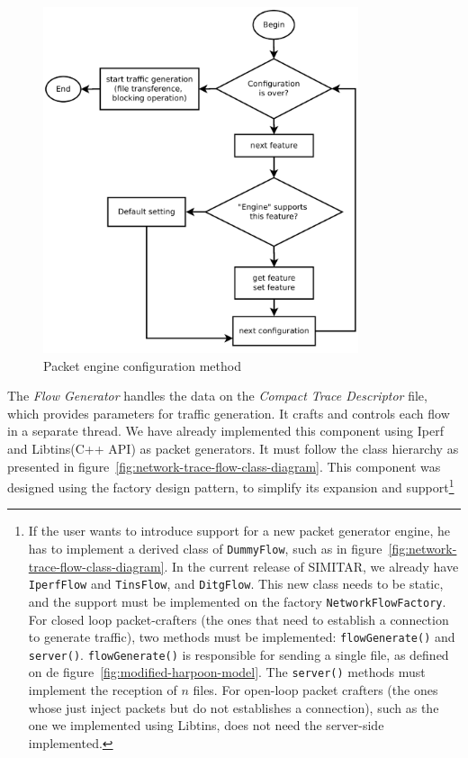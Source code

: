 \begin{figure}[pht!]
    \centering
    \includegraphics[height=4.0in]{figures/ch3/alg-traffic-engine-config}
    \caption{Packet engine configuration method}
    \label{fig:alg-traffic-engine-config}
\end{figure}



The \textit{Flow Generator} handles the data on the \textit{Compact Trace Descriptor} file, which provides parameters for traffic generation. It crafts and controls each flow in a separate thread.
 We have already implemented this component using Iperf and Libtins(C++ API)\cite{web-libtins} as packet generators. It must follow the class hierarchy as presented in figure~\ref{fig:network-trace-flow-class-diagram}. This component was designed using the factory design pattern, to simplify its expansion and support\footnote{
If the user wants to introduce support for a new packet generator engine, he has to implement a derived class of \texttt{DummyFlow}, such as in figure~\ref{fig:network-trace-flow-class-diagram}. In the current release of SIMITAR, we already have \texttt{IperfFlow} and \texttt{TinsFlow}, and \texttt{DitgFlow}. This new class needs to be static, and the support must be implemented on the factory \texttt{NetworkFlowFactory}.
For closed loop packet-crafters (the ones that need to establish a connection to generate traffic), two methods must be implemented: \texttt{flowGenerate()} and \texttt{server()}. \texttt{flowGenerate()} is responsible for sending a single file, as defined on de figure~\ref{fig:modified-harpoon-model}. The \texttt{server()} methods must implement the reception of $n$ files. For open-loop packet crafters (the ones whose just inject packets but do not establishes a connection), such as the one we implemented using Libtins, does not need the server-side implemented. }


